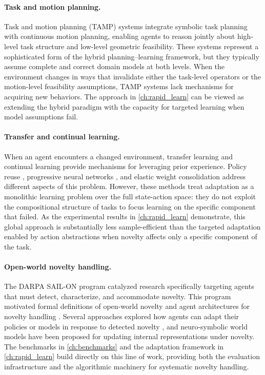 \paragraph{Task and motion planning.}
Task and motion planning (TAMP) systems \citep{garrett2021integrated, kaelbling2011hierarchical} integrate symbolic task planning with continuous motion planning, enabling agents to reason jointly about high-level task structure and low-level geometric feasibility. These systems represent a sophisticated form of the hybrid planning--learning framework, but they typically assume complete and correct domain models at both levels. When the environment changes in ways that invalidate either the task-level operators or the motion-level feasibility assumptions, TAMP systems lack mechanisms for acquiring new behaviors. The approach in \cref{ch:rapid_learn} can be viewed as extending the hybrid paradigm with the capacity for targeted learning when model assumptions fail.

\paragraph{Transfer and continual learning.}
When an agent encounters a changed environment, transfer learning and continual learning provide mechanisms for leveraging prior experience. Policy reuse \citep{glatt2017policy}, progressive neural networks \citep{rusu2016progressive}, and elastic weight consolidation \citep{kirkpatrick2017overcoming} address different aspects of this problem. However, these methods treat adaptation as a monolithic learning problem over the full state-action space: they do not exploit the compositional structure of tasks to focus learning on the specific component that failed. As the experimental results in \cref{ch:rapid_learn} demonstrate, this global approach is substantially less sample-efficient than the targeted adaptation enabled by action abstractions when novelty affects only a specific component of the task.

\paragraph{Open-world novelty handling.}
The DARPA SAIL-ON program \citep{senator2019science} catalyzed research specifically targeting agents that must detect, characterize, and accommodate novelty. This program motivated formal definitions of open-world novelty \citep{boult2021towards, langley2020open} and agent architectures for novelty handling \citep{muhammad2021novelty, goel2024neurosymbolic}. Several approaches explored how agents can adapt their policies or models in response to detected novelty \citep{balloch2022novgrid, balloch2023neuro}, and neuro-symbolic world models have been proposed for updating internal representations under novelty. The benchmarks in \cref{ch:benchmarks} and the adaptation framework in \cref{ch:rapid_learn} build directly on this line of work, providing both the evaluation infrastructure and the algorithmic machinery for systematic novelty handling.

